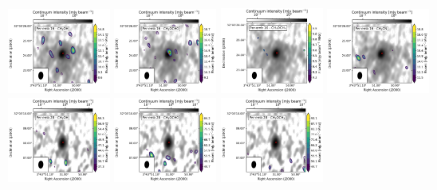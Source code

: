 \begin{figure}[htbp!]
  \centering
  \includegraphics[width=0.24\textwidth]{./moment0/Set3_ID09_CH3OH_243915.pdf}
  \includegraphics[width=0.24\textwidth]{./moment0/Set3_ID09_CH3OCHO_259342.pdf}
  \includegraphics[width=0.24\textwidth]{./moment0/Set3_ID09_CH3OCH3_259311.pdf}
  \includegraphics[width=0.24\textwidth]{./moment0/Set3_ID09_CH3CN_257527.pdf}
  \\
  \includegraphics[width=0.24\textwidth]{./moment0/Set3_ID09_2_CH3OH_243915.pdf}
  \includegraphics[width=0.24\textwidth]{./moment0/Set3_ID09_2_CH3OCHO_259342.pdf}
  \includegraphics[width=0.24\textwidth]{./moment0/Set3_ID09_2_CH3OCH3_259311.pdf}

\end{figure}
